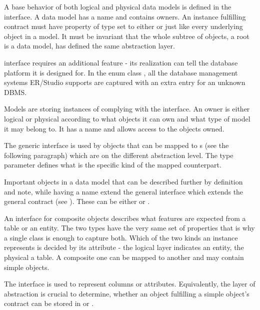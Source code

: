 A base behavior of both logical and physical data models is defined in the  interface.
A data model has a name and contains owners. An instance fulfilling  contract must have property of type  set to either  or  just like every underlying object in a model.
It must be invariant that the whole subtree of objects, a root is a data model, has defined the same abstraction layer.

 interface requires an additional feature - its realization can tell the database platform it is designed for. 
In the enum class , all the database management systems ER/Studio supports are captured with an extra entry for an unknown DBMS.

Models are storing instances of complying with the  interface. An owner is either logical or physical according to what objects it can own and what type of model it may belong to. 
It has a name and allows access to the objects owned.

The generic interface  is used by objects that can be mapped to s (see the following paragraph) which are on the different abstraction level. The type parameter defines what is the specific kind of the mapped counterpart.

Important objects in a data model that can be described further by definition and note, while having a name extend the general  interface which extends the general  contract (see ). 
These can be either  or .

An interface for composite objects describes what features are expected from a table or an entity.
The two types have the very same set of properties that is why a single class is enough to capture both. 
Which of the two kinds an instance represents is decided by its  attribute - the logical layer indicates an entity, the physical a table.
A composite one can be mapped to another  and may contain simple objects.

The  interface is used to represent columns or attributes. Equivalently, the layer of abstraction is crucial to determine, whether an object fulfilling a simple object's contract can be stored in  or .

